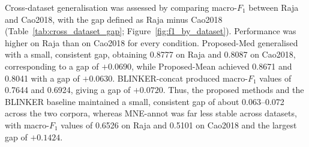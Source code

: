 Cross-dataset generalisation was assessed by comparing macro-$F_1$ between Raja and Cao2018, with the gap defined as Raja minus Cao2018 (Table~\ref{tab:cross_dataset_gap}; Figure~\ref{fig:f1_by_dataset}). Performance was higher on Raja than on Cao2018 for every condition. Proposed-Med generalised with a small, consistent gap, obtaining 0.8777 on Raja and 0.8087 on Cao2018, corresponding to a gap of $+0.0690$, while Proposed-Mean achieved 0.8671 and 0.8041 with a gap of $+0.0630$. BLINKER-concat produced macro-$F_1$ values of 0.7644 and 0.6924, giving a gap of $+0.0720$. Thus, the proposed methods and the BLINKER baseline maintained a small, consistent gap of about 0.063--0.072 across the two corpora, whereas MNE-annot was far less stable across datasets, with macro-$F_1$ values of 0.6526 on Raja and 0.5101 on Cao2018 and the largest gap of $+0.1424$.
